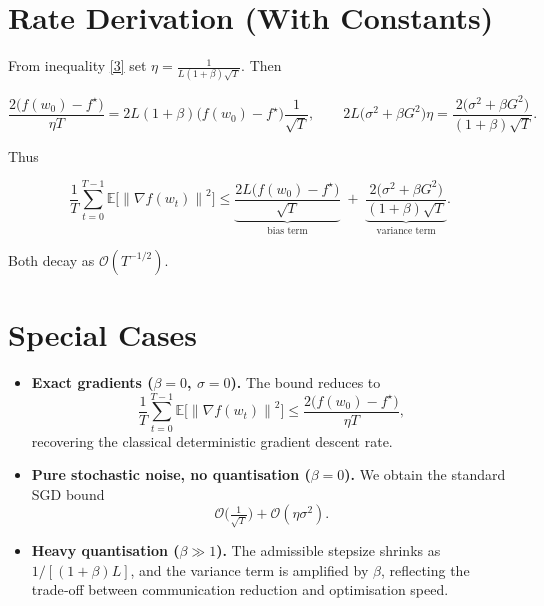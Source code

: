 \documentclass[11pt]{article}
\newcommand{\EE}{\mathbb{E}}
\newcommand{\norm}[1]{\left\lVert#1\right\rVert}
\begin{document}
\section*{Rate Derivation (With Constants)}
From inequality \eqref{3} set $\eta = \frac{1}{L(1+\beta)\sqrt{T}}$.  Then

\[
\frac{2\big(f(w_0)-f^\star\big)}{\eta T}
= 2L(1+\beta)\big(f(w_0)-f^\star\big)\frac{1}{\sqrt{T}},
\qquad
2L\big(\sigma^2+\beta G^2\big)\eta
= \frac{2\big(\sigma^2+\beta G^2\big)}{(1+\beta)\sqrt{T}} .
\]

Thus

\[
\frac{1}{T}\sum_{t=0}^{T-1}\EE\!\big[\norm{\nabla f(w_t)}^2\big]
\le
\underbrace{\frac{2L\big(f(w_0)-f^\star\big)}{\sqrt{T}}}_{\text{bias term}}
\;+\;
\underbrace{\frac{2\big(\sigma^2+\beta G^2\big)}{(1+\beta)\sqrt{T}}}_{\text{variance term}} .
\]

Both decay as $\mathcal{O}(T^{-1/2})$.

\section*{Special Cases}
\begin{itemize}
\item \textbf{Exact gradients ($\beta=0$, $\sigma=0$).} The bound reduces to
\[
\frac{1}{T}\sum_{t=0}^{T-1}\EE\!\big[\norm{\nabla f(w_t)}^2\big]
\le \frac{2\big(f(w_0)-f^\star\big)}{\eta T},
\]
recovering the classical deterministic gradient descent rate.
\item \textbf{Pure stochastic noise, no quantisation ($\beta=0$).} We obtain the standard SGD bound 
\[
\mathcal{O}\!\big(\tfrac{1}{\sqrt{T}}\big)+\mathcal{O}(\eta\sigma^2).
\]
\item \textbf{Heavy quantisation ($\beta\gg 1$).} The admissible stepsize shrinks as $1/[(1+\beta)L]$, and the variance term is amplified by $\beta$, reflecting the trade‑off between communication reduction and optimisation speed.
\end{itemize}
\end{document}
